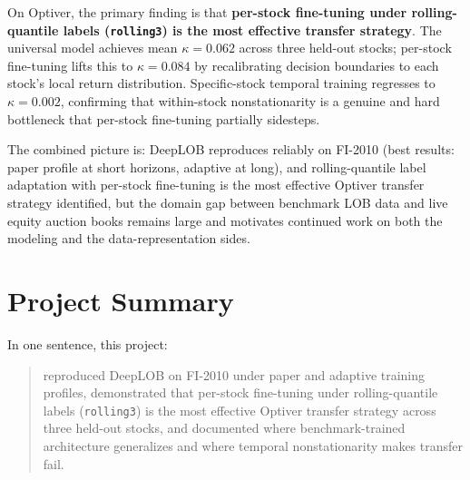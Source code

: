 \documentclass[11pt]{article}
\begin{document}
On Optiver, the primary finding is that \textbf{per-stock fine-tuning under rolling-quantile labels (\texttt{rolling3}) is the most effective transfer strategy}. The universal model achieves mean $\kappa{=}0.062$ across three held-out stocks; per-stock fine-tuning lifts this to $\kappa{=}0.084$ by recalibrating decision boundaries to each stock's local return distribution. Specific-stock temporal training regresses to $\kappa{=}0.002$, confirming that within-stock nonstationarity is a genuine and hard bottleneck that per-stock fine-tuning partially sidesteps.

The combined picture is: DeepLOB reproduces reliably on FI-2010 (best results: paper profile at short horizons, adaptive at long), and rolling-quantile label adaptation with per-stock fine-tuning is the most effective Optiver transfer strategy identified, but the domain gap between benchmark LOB data and live equity auction books remains large and motivates continued work on both the modeling and the data-representation sides.

\section*{Project Summary}
In one sentence, this project:
\begin{quote}
reproduced DeepLOB on FI-2010 under paper and adaptive training profiles, demonstrated that per-stock fine-tuning under rolling-quantile labels (\texttt{rolling3}) is the most effective Optiver transfer strategy across three held-out stocks, and documented where benchmark-trained architecture generalizes and where temporal nonstationarity makes transfer fail.
\end{quote}



\end{document}
